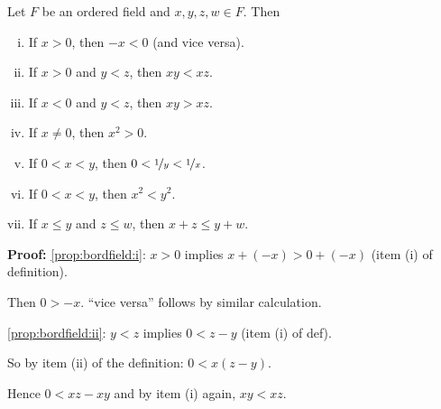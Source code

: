 \documentclass[10pt,aspectratio=149]{beamer}
\begin{document}
\begin{frame}

\begin{proposition}
Let $F$ be an ordered field and $x,y,z,w \in F$.  Then
\begin{enumerate}[(i)]
\pause
\item \label{prop:bordfield:i} If $x > 0$, then $-x < 0$ (and vice versa).
\pause
\item \label{prop:bordfield:ii} If $x > 0$ and $y < z$, then $xy < xz$.
\pause
\item \label{prop:bordfield:iii} If $x < 0$ and $y < z$, then $xy > xz$.
\pause
\item \label{prop:bordfield:iv} If $x \not= 0$, then $x^2 > 0$.
\pause
\quad{}
\pause
\item \label{prop:bordfield:v} If $0 < x < y$, then $0 < \nicefrac{1}{y} < \nicefrac{1}{x}$.
\pause
\item \label{prop:bordfield:vi} If $0 < x < y$, then $x^2 < y^2$.
\pause
\item \label{prop:bordfield:vii} If $x \leq y$ and $z \leq w$, then $x + z \leq y + w$.
\end{enumerate}
\end{proposition}

\pause

\textbf{Proof:}
\eqref{prop:bordfield:i}:  $x > 0$ implies $x + (-x) > 0 + (-x)$
(item (i) of definition).
\pause

Then $0 > -x$. 
\pause
\quad ``vice versa'' follows by similar calculation.

\medskip
\pause

\eqref{prop:bordfield:ii}: $y < z$ implies $0 < z - y$ (item (i) of def).  
\pause

So by item (ii) of the definition: $0 < x(z-y)$.

\pause
Hence $0 < xz - xy$ and by item (i) again, $xy < xz$.

\end{frame}
\end{document}
